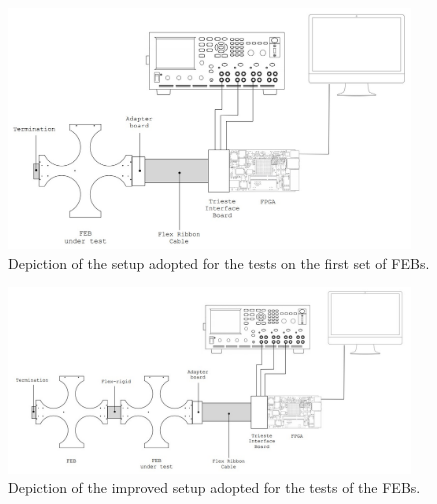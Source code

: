 \begin{figure}[h!]
    \centering
    \includegraphics[width=0.95\textwidth]{Images/chap2/test_setup_FEB_1.jpg}
    \caption{Depiction of the setup adopted for the tests on the first set of FEBs.}
    \label{figFEBtest1}
\end{figure}

\begin{figure}[h!]
    \centering
    \includegraphics[width=0.95\textwidth]{Images/chap2/test_setup_FEB_2.jpg}
    \caption{Depiction of the improved setup adopted for the tests of the FEBs.}
    \label{figFEBtest2}
\end{figure}

